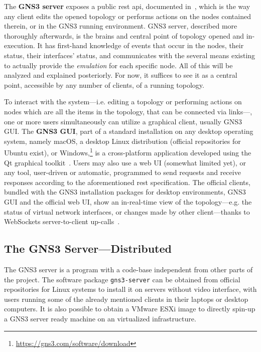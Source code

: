 The \textbf{GNS3 server} exposes a public \gls{rest} \gls{api}, documented in~\cite{gns3devarch}, which is the way any client edits the opened topology or performs actions on the nodes contained therein, or in the GNS3 running environment.
GNS3 server, described more thoroughly afterwards, is the brains and central point of topology opened and in-execution.
It has first-hand knowledge of events that occur in the nodes, their status, their interfaces' status, and communicates with the several means existing to actually provide the \emph{emulation} for each specific node.
All of this will be analyzed and explained posteriorly.
For now, it suffices to see it as a central point, accessible by any number of clients, of a running topology.

To interact with the system---i.e. editing a topology or performing actions on nodes which are all the items in the topology, that can be connected via links---, one or more users simultaneously can utilize a graphical client, usually GNS3 GUI. The \textbf{GNS3 GUI}, part of a standard installation on any desktop operating system, namely macOS, a desktop Linux distribution (official repositories for Ubuntu exist), or Windows,\footnote{\url{https://gns3.com/software/download}} is a cross-platform application developed using the Qt graphical toolkit~\cite{qttoolkit}.
Users may also use a web UI (somewhat limited yet), or any tool, user-driven or automatic, programmed to send requests and receive responses according to the aforementioned \gls{rest} specification.
The official clients, bundled with the GNS3 installation packages for desktop environments, GNS3 GUI and the official web UI, show an in-real-time view of the topology---e.g. the status of virtual network interfaces, or changes made by other client---thanks to WebSockets server-to-client up-calls~\cite{ytgns3arch22}. %



\subsection{The GNS3 Server---Distributed}
\label{subsec:gns3serverindetail}

The GNS3 server is a program with a code-base independent from other parts of the project.
The software package \texttt{gns3-server} can be obtained from official repositories for Linux systems to install it on servers without video interface, with users running some of the already mentioned clients in their laptops or desktop computers.
It is also possible to obtain a VMware ESXi image to directly spin-up a GNS3 server ready machine on an virtualized infrastructure.

